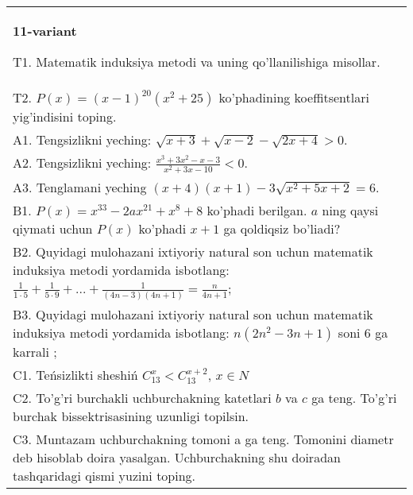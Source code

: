 \documentclass{article}
\begin{document}
\begin{tabular}{m{17cm}}
\textbf{11-variant}
\newline

T1. Matematik induksiya metodi va uning qo'llanilishiga misollar. \\
T2. \(P(x) = (x - 1)^{20}\left( x^{2} + 25 \right)\) ko'phadining koeffitsentlari yig'indisini toping. \\
A1. Tengsizlikni yeching: \(\sqrt{x + 3} + \sqrt{x - 2} - \sqrt{2x + 4} > 0\). \\
A2. Tengsizlikni yeching: \(\frac{x^{3} + 3x^{2} - x - 3}{x^{2} + 3x - 10} < 0\). \\
A3. Tenglamani yeching \((x + 4)(x + 1) - 3\sqrt{x^{2} + 5x + 2} = 6\). \\
B1. \(P(x) = x^{33} - 2ax^{21} + x^{8} + 8\) ko'phadi berilgan. \(a\) ning qaysi qiymati uchun \(P(x)\) ko'phadi \(x + 1\) ga qoldiqsiz bo'liadi? \\
B2. Quyidagi mulohazani ixtiyoriy natural son uchun matematik induksiya metodi yordamida isbotlang: \(\frac{1}{1 \cdot 5} + \frac{1}{5 \cdot 9} + ... + \frac{1}{(4n - 3)(4n + 1)} = \frac{n}{4n + 1}\); \\
B3. Quyidagi mulohazani ixtiyoriy natural son uchun matematik induksiya metodi yordamida isbotlang: \(n\left( 2n^{2} - 3n + 1 \right)\) soni 6 ga karrali ; \\
C1. Teńsizlikti sheshiń \(C_{13}^{x} < C_{13}^{x + 2}\), \(x \in N\) \\
C2. To'g'ri burchakli uchburchakning katetlari \(b\) va \(c\) ga teng. To'g'ri burchak bissektrisasining uzunligi topilsin. \\
C3. Muntazam uchburchakning tomoni a ga teng. Tomonini diametr deb hisoblab doira yasalgan. Uchburchakning shu doiradan tashqaridagi qismi yuzini toping. \\

\end{tabular}
\vspace{1cm}
\end{document}
